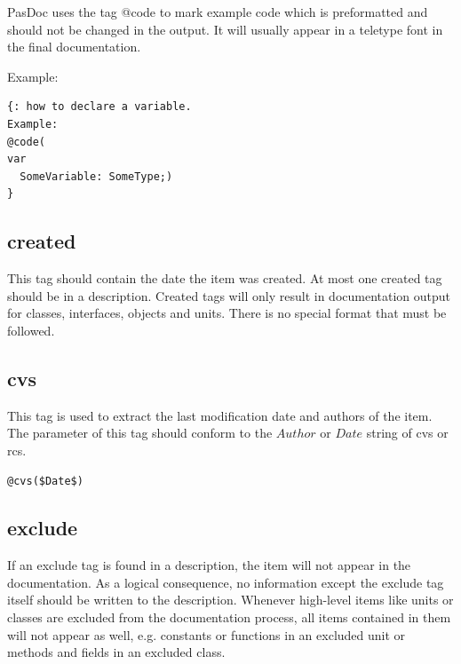 \documentclass[11pt]{article}
\begin{document}
PasDoc uses the tag @code to mark example code which is preformatted and should
not be changed in the output. It will usually appear in a teletype font in
the final documentation.

Example:
\begin{verbatim}
{: how to declare a variable.
Example:
@code(
var
  SomeVariable: SomeType;)
}
\end{verbatim}


\subsection{created}

This tag should contain the date the item was created.
At most one created tag should be in a description.
Created tags will only result in documentation output for
classes, interfaces, objects and units.
There is no special format that must be followed.

\subsection{cvs}

This tag is used to extract the last modification
date and authors of the item. The parameter of this
tag should conform to the $Author$ or $Date$ string
of cvs or rcs.

\begin{verbatim}
@cvs($Date$)
\end{verbatim}

\subsection{exclude}

If an exclude tag is found in a description, the item will not
appear in the documentation.
As a logical consequence, no information except the
exclude tag itself should be written to the description.
Whenever high-level items like units or classes are excluded from the
documentation process, all items contained in them will not appear as well,
e.g. constants or functions in an excluded unit or methods and fields in
an excluded class.
\end{document}
